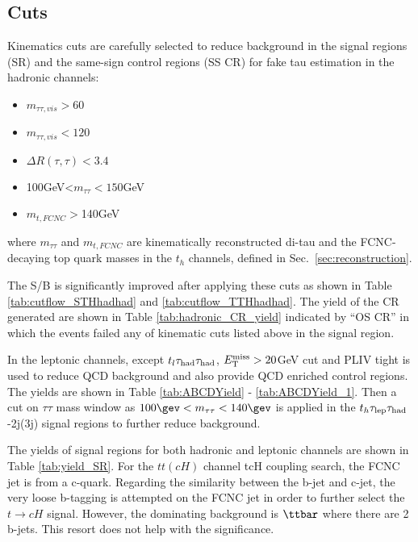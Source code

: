 
\subsection{Cuts}
\label{sec:cuts}

Kinematics cuts are carefully selected to reduce background in the signal regions (SR) and the same-sign control regions (SS CR) for fake tau estimation in the hadronic channels:
\begin{itemize}
  \item $m_{\tau\tau,vis}>60$
  \item $m_{\tau\tau,vis}<120$
  \item $\Delta R(\tau,\tau)<3.4$
  \item 100GeV<$m_{\tau\tau}<150$GeV
  \item $m_{t,FCNC}>$140GeV
\end{itemize}
where $m_{\tau\tau}$ and $m_{t,FCNC}$ are kinematically reconstructed di-tau and the FCNC-decaying top quark masses in the $t_h$ channels, defined in Sec.~\ref{sec:reconstruction}.

The S/B is significantly improved after applying these cuts as shown in Table \ref{tab:cutflow_STHhadhad} and \ref{tab:cutflow_TTHhadhad}. The yield of the CR generated are shown in Table \ref{tab:hadronic_CR_yield} indicated by ``OS CR'' in which the events failed any of kinematic cuts listed above in the signal region.

In the leptonic channels, except $t_l\tau_\text{had}{}\tau_\text{had}$, $E_{\text{T}}^{\text{miss}}>20$GeV cut and PLIV tight is used to reduce QCD background and also provide QCD enriched control regions. The yields are shown in Table \ref{tab:ABCDYield} - \ref{tab:ABCDYield_1}. Then a cut on $\tau\tau$ mass window as $100\gev<m_{\tau\tau}<140\gev$ is applied in the $t_h\tau_\text{lep}{}\tau_\text{had}$-2j(3j) signal regions to further reduce background.

The yields of signal regions for both hadronic and leptonic channels are shown in Table \ref{tab:yield_SR}.
For the $tt(cH)$ channel tcH coupling search, the FCNC jet is from a c-quark. Regarding the similarity between the b-jet and c-jet,
the very loose b-tagging is attempted on the FCNC jet in order to further select the $t\to cH$ signal. However,
the dominating background is $\ttbar$ where there are 2 b-jets. This resort does not help with the significance.
